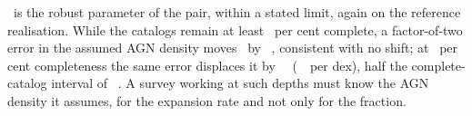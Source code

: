 \Hz\ is the robust parameter of the pair, within a stated limit, again on
the reference realisation. While the
catalogs remain at least \CompMTwenty\ per cent complete, a factor-of-two
error in the assumed AGN density moves \Hz\ by
\HzDensityShiftFactorTwoDeep~\kmsmpc, consistent with no shift; at
\CompMEighteen\ per cent
completeness the same error displaces it by
\HzDensityShiftFactorTwo~\kmsmpc\ (\HzDensitySlopeShallow~\kmsmpc\ per
dex), half the complete-catalog interval of \HzeroJointWidth~\kmsmpc. A survey working at such depths must know the AGN
density it assumes, for the expansion rate and not only for the fraction.
